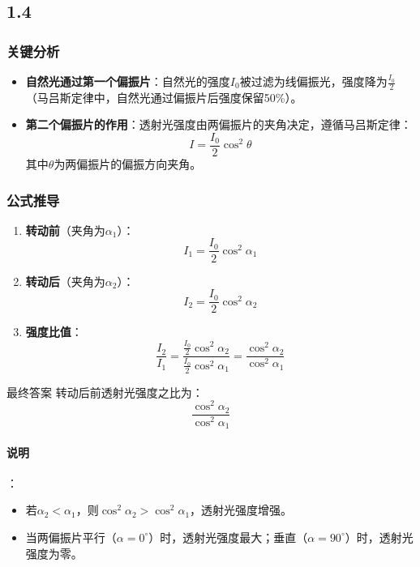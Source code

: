 \documentclass{article}
\begin{document}
%
\subsection*{1.4}

\subsubsection*{关键分析}
\begin{itemize}
\item \textbf{自然光通过第一个偏振片}：自然光的强度\(I_0\)被过滤为线偏振光，强度降为\(\frac{I_0}{2}\)（马吕斯定律中，自然光通过偏振片后强度保留50\%）。
\item \textbf{第二个偏振片的作用}：透射光强度由两偏振片的夹角决定，遵循马吕斯定律：
\[
I = \frac{I_0}{2} \cos^2\theta
\]
其中\(\theta\)为两偏振片的偏振方向夹角。
\end{itemize}

\subsubsection*{公式推导}
\begin{enumerate}
\item \textbf{转动前}（夹角为\(\alpha_1\)）：
\[
I_1 = \frac{I_0}{2} \cos^2\alpha_1
\]
\item \textbf{转动后}（夹角为\(\alpha_2\)）：
\[
I_2 = \frac{I_0}{2} \cos^2\alpha_2
\]
\item \textbf{强度比值}：
\[
\frac{I_2}{I_1} = \frac{\frac{I_0}{2} \cos^2\alpha_2}{\frac{I_0}{2} \cos^2\alpha_1} = \frac{\cos^2\alpha_2}{\cos^2\alpha_1}
\]
\end{enumerate}

最终答案
转动{\color{red}后前}透射光强度之比为：
\[
\boxed{\frac{\cos^2\alpha_2}{\cos^2\alpha_1}}
\]

\paragraph*{说明}：
\begin{itemize}
\item 若\(\alpha_2 < \alpha_1\)，则\(\cos^2\alpha_2 > \cos^2\alpha_1\)，透射光强度增强。
\item 当两偏振片平行（\(\alpha = 0^\circ\)）时，透射光强度最大；垂直（\(\alpha = 90^\circ\)）时，透射光强度为零。
\end{itemize}
%
\end{document}
